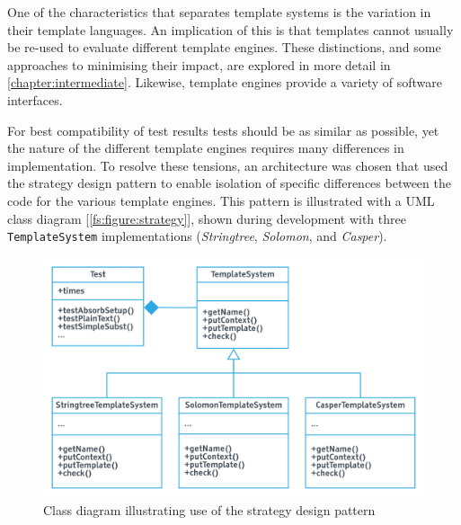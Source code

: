One of the characteristics that separates template systems is the variation in their \gls{template language}s. An implication of this is that templates cannot usually be re-used to evaluate different \gls{template engine}s. These distinctions, and some approaches to minimising their impact, are explored in more detail in \autoref{chapter:intermediate}. Likewise, \gls{template engine}s provide a variety of software interfaces.

For best compatibility of test results tests should be as similar as possible, yet the nature of the different \gls{template engine}s requires many differences in implementation. To resolve these tensions, an architecture was chosen that used the \gls{strategy design pattern} \citep{Gamma1994} to enable isolation of specific differences between the code for the various \gls{template engine}s. This pattern is illustrated with a UML class diagram [\autoref{fs:figure:strategy}], shown during development with three \texttt{TemplateSystem} implementations (\emph{Stringtree}, \emph{Solomon}, and \emph{Casper}).

\begin{figure}[ht!]
\centering
\includegraphics[width=\columnwidth]{Figures/classes.png}
\caption{Class diagram illustrating use of the \gls{strategy design pattern}}
\label{fs:figure:strategy}
\end{figure}

